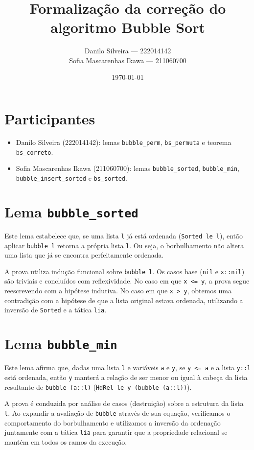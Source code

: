 \documentclass{article}
\title{Formalização da correção do algoritmo Bubble Sort}
\author{%
  Danilo Silveira --- 222014142 \\
  Sofia Mascarenhas Ikawa --- 211060700
}
\date{\today}
\begin{document}
\maketitle

\section*{Participantes}

\begin{itemize}
  \item Danilo Silveira (222014142): lemas \texttt{bubble\_perm},
        \texttt{bs\_permuta} e teorema \texttt{bs\_correto}.
  \item Sofia Mascarenhas Ikawa (211060700): lemas \texttt{bubble\_sorted},
        \texttt{bubble\_min}, \texttt{bubble\_insert\_sorted} e \texttt{bs\_sorted}.
\end{itemize}

\section*{Lema \texttt{bubble\_sorted}}

Este lema estabelece que, se uma lista \texttt{l} já está ordenada
(\texttt{Sorted le l}), então aplicar \texttt{bubble l} retorna a própria
lista \texttt{l}. Ou seja, o borbulhamento não altera uma lista que já se
encontra perfeitamente ordenada.

A prova utiliza indução funcional sobre \texttt{bubble l}. Os casos base
(\texttt{nil} e \texttt{x::nil}) são triviais e concluídos com reflexividade.
No caso em que \texttt{x <= y}, a prova segue reescrevendo com a hipótese
indutiva. No caso em que \texttt{x > y}, obtemos uma contradição com a hipótese
de que a lista original estava ordenada, utilizando a inversão de \texttt{Sorted}
e a tática \texttt{lia}.

\section*{Lema \texttt{bubble\_min}}

Este lema afirma que, dadas uma lista \texttt{l} e variáveis \texttt{a} e
\texttt{y}, se \texttt{y <= a} e a lista \texttt{y::l} está ordenada, então
\texttt{y} manterá a relação de ser menor ou igual à cabeça da lista resultante
de \texttt{bubble (a::l)} (\texttt{HdRel le y (bubble (a::l))}).

A prova é conduzida por análise de casos (destruição) sobre a estrutura da
lista \texttt{l}. Ao expandir a avaliação de \texttt{bubble} através de sua
equação, verificamos o comportamento do borbulhamento e utilizamos a inversão
da ordenação juntamente com a tática \texttt{lia} para garantir que a
propriedade relacional se mantém em todos os ramos da execução.
\end{document}
